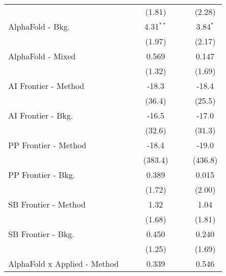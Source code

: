 \begin{tabular}{lcccccc}
                                &               &         & (1.81)        &               &        & (2.28)\\   
   AlphaFold - Bkg.             &               &         & 4.31$^{**}$   &               &        & 3.84$^{*}$\\   
                                &               &         & (1.97)        &               &        & (2.17)\\   
   AlphaFold - Mixed            &               &         & 0.569         &               &        & 0.147\\   
                                &               &         & (1.32)        &               &        & (1.69)\\   
   AI Frontier - Method         &               &         & -18.3         &               &        & -18.4\\   
                                &               &         & (36.4)        &               &        & (25.5)\\   
   AI Frontier - Bkg.           &               &         & -16.5         &               &        & -17.0\\   
                                &               &         & (32.6)        &               &        & (31.3)\\   
   PP Frontier - Method         &               &         & -18.4         &               &        & -19.0\\   
                                &               &         & (383.4)       &               &        & (436.8)\\   
   PP Frontier - Bkg.           &               &         & 0.389         &               &        & 0.015\\   
                                &               &         & (1.72)        &               &        & (2.00)\\   
   SB Frontier - Method         &               &         & 1.32          &               &        & 1.04\\   
                                &               &         & (1.68)        &               &        & (1.81)\\   
   SB Frontier - Bkg.           &               &         & 0.450         &               &        & 0.240\\   
                                &               &         & (1.25)        &               &        & (1.69)\\   
   AlphaFold x Applied - Method &               &         & 0.339         &               &        & 0.546\\   

\end{tabular}
